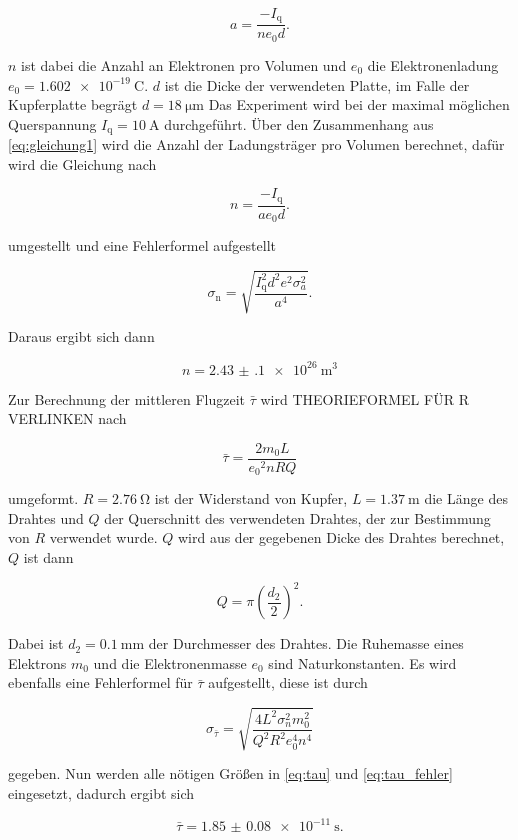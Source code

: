 \begin{equation}
    a = \frac{-I_\text{q}}{n e_0 d}.
    \label{eq:gleichung1}
\end{equation}

$n$ ist dabei die Anzahl an Elektronen pro Volumen und $e_0$ die Elektronenladung $e_0 = \SI{1.602e-19}{\coulomb}$. $d$ ist die Dicke der verwendeten Platte, im Falle der Kupferplatte begrägt $d = \SI{18}{\micro\meter}$
Das Experiment wird bei der maximal möglichen Querspannung $I_\text{q} = \SI{10}{\ampere}$ durchgeführt.
Über den Zusammenhang aus \autoref{eq:gleichung1} wird die Anzahl der Ladungsträger pro Volumen berechnet, dafür wird die Gleichung nach 

\begin{equation}
    n = \frac{-I_\text{q}}{a e_0 d}.
    \label{eq:gleichung2}
\end{equation}

umgestellt und eine Fehlerformel aufgestellt

\begin{equation}
    \sigma _\text{n} = \sqrt{\frac {I_\text{q}^{2} d^{2} e^{2} \sigma_{a}^{2} }{a^{4}}}.
    \label{eq:gleichung3}
\end{equation}

Daraus ergibt sich dann

\begin{equation}
    n = \SI{2.43(10)e26}{\cubic\meter}
    \label{eq:n1}
\end{equation}

Zur Berechnung der mittleren Flugzeit $\bar{\tau}$ wird THEORIEFORMEL FÜR R VERLINKEN nach

\begin{equation}
    \bar{\tau} = \frac{2m_0 L}{{e_0}^2 n R Q}
    \label{eq:tau}
\end{equation}

umgeformt.
$R = \SI{2.76}{\ohm}$ ist der Widerstand von Kupfer, $L = \SI{1.37}{\meter}$ die Länge des Drahtes und $Q$ der Querschnitt des verwendeten Drahtes, der zur Bestimmung von $R$ verwendet wurde.
$Q$ wird aus der gegebenen Dicke des Drahtes berechnet, $Q$ ist dann

\begin{equation}
    Q = \pi \left(\frac{d_2}{2}\right)^2.
    \label{eq:Q}
\end{equation}

Dabei ist $d_2 = \SI{0.1}{\milli\meter}$ der Durchmesser des Drahtes.
Die Ruhemasse eines Elektrons $m_0$ und die Elektronenmasse $e_0$ sind Naturkonstanten.\cite{physics_constants}
Es wird ebenfalls eine Fehlerformel für $\bar{\tau}$ aufgestellt, diese ist durch 

\begin{equation}
    \sigma _{\bar{\tau}} = \sqrt{\frac{4 L^{2} \sigma_{n}^{2} m_{0}^{2}}{Q^{2} R^{2} e_{0}^{4} n^{4}}}
    \label{eq:tau_fehler}
\end{equation}

gegeben. 
Nun werden alle nötigen Größen in \autoref{eq:tau} und \autoref{eq:tau_fehler} eingesetzt, dadurch ergibt sich

\begin{equation}
    \bar{\tau} = \SI{1.85(8)e-11}{\second}.
    \label{eq:Tau1}
\end{equation}